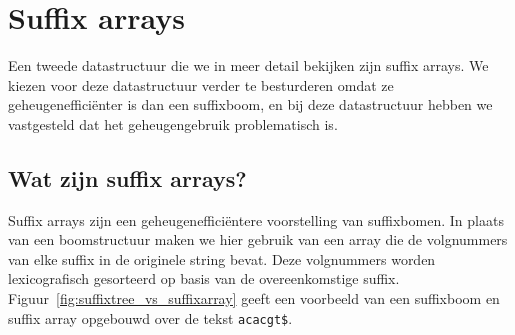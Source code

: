 \chapter{Suffix arrays}\label{ch:suffix-arrays}
Een tweede datastructuur die we in meer detail bekijken zijn suffix arrays.
We kiezen voor deze datastructuur verder te besturderen omdat ze geheugenefficiënter is dan een suffixboom, en bij deze datastructuur hebben we vastgesteld dat het geheugengebruik problematisch is.


\section{Wat zijn suffix arrays?}\label{sec:wat-zijn-suffix-arrays?}
Suffix arrays zijn een geheugenefficiëntere voorstelling van suffixbomen.
In plaats van een boomstructuur maken we hier gebruik van een array die de volgnummers van elke suffix in de originele string bevat.
Deze volgnummers worden lexicografisch gesorteerd op basis van de overeenkomstige suffix.
Figuur~\ref{fig:suffixtree_vs_suffixarray} geeft een voorbeeld van een suffixboom en suffix array opgebouwd over de tekst \texttt{acacgt\$}.

